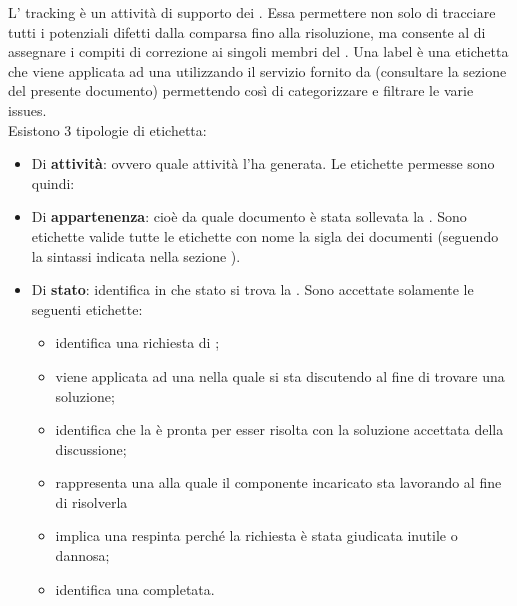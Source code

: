 			L' tracking è un attività di supporto dei . Essa permettere non solo di tracciare tutti i potenziali difetti dalla comparsa fino alla risoluzione, ma consente al  di assegnare i compiti di correzione ai singoli membri del .
				\label{sec:SintassiLabel}
				Una label è una etichetta che viene applicata ad una  utilizzando il servizio fornito da  (consultare la sezione  del presente documento) permettendo così di categorizzare e filtrare le varie issues.\\
				Esistono 3 tipologie di etichetta:
				\begin{itemize}
				    \item Di \textbf{attività}: ovvero quale attività l'ha generata. Le etichette permesse sono quindi: 
				    \item Di \textbf{appartenenza}: cioè da quale documento è stata sollevata la . Sono etichette valide tutte le etichette con nome la sigla dei documenti (seguendo la sintassi indicata nella sezione ).
				    \item Di \textbf{stato}: identifica in che stato si trova la . Sono accettate solamente le seguenti etichette:
				\begin{itemize}
				    \item {} identifica una richiesta di ;
				    \item {} viene applicata ad una  nella quale si sta discutendo al fine di trovare una soluzione;
				    \item {} identifica che la  è pronta per esser risolta con la soluzione accettata della discussione;
				    \item {} rappresenta una  alla quale il componente incaricato sta lavorando al fine di risolverla
				    \item {} implica una  respinta perché la richiesta è stata giudicata inutile o dannosa;
				    \item {} identifica una  completata.
				\end{itemize}
				\end{itemize}

